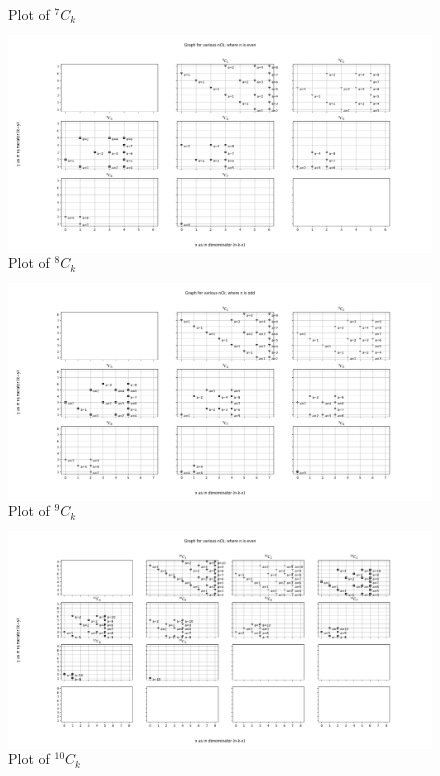 \documentclass[10pt, twoside]{article}
\newcommand*{\Combination}[2]{{}^{#1}C_{#2}}%
\begin{document}
\begin{appendices}
\begin{figure}[ph!]
	\caption{Plot of $\Combination{7}{k}$}
	\label{7Ck}
\end{figure}
\begin{figure}[ph!]	
	\includegraphics[width=\linewidth]{8Ck.png}
	\caption{Plot of $\Combination{8}{k}$}
	\label{8Ck}
\end{figure}
\begin{figure}[ph!]	
	\includegraphics[width=\linewidth]{9Ck.png}
	\caption{Plot of $\Combination{9}{k}$}
	\label{9Ck}
\end{figure}
\begin{figure}[ph!]	
	\includegraphics[width=\linewidth]{10Ck.png}
	\caption{Plot of $\Combination{10}{k}$}

\end{figure}
\end{appendices}
\end{document}
